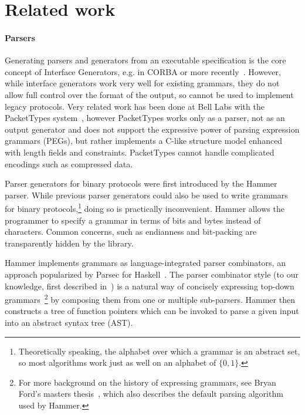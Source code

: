\section{Related work}
\label{s:relwk}






\paragraph{Parsers}

Generating parsers and generators from an executable specification
is the core concept of Interface Generators, e.g. in CORBA or more
recently~\cite{varda2008}. However, while interface generators work
very well for existing grammars, they do not allow full control over the
format of the output, so cannot be used to implement legacy protocols.
Very related work has been done at Bell Labs with the PacketTypes
system~\cite{mccann2000packet}, however PacketTypes works only as a
parser, not as an output generator and does not support the expressive
power of parsing expression grammars (PEGs), but rather implements a
C-like structure model enhanced with  length fields and
constraints. PacketTypes cannot handle complicated encodings such as  compressed data.

Parser generators for binary protocols were first introduced by the
Hammer~\cite{hammer-parser} parser.
While previous parser generators could also be used to write grammars
for binary protocols,\footnote{Theoretically speaking, the alphabet
over which a grammar is an  abstract set, so most algorithms work
just as well on an alphabet of $\{0,1\}$.} doing so is practically
inconvenient. Hammer allows the programmer to specify a grammar in
terms of bits and bytes instead of characters. Common concerns, such as
endianness and bit-packing are transparently hidden by the library. 

Hammer implements grammars as language-integrated parser combinators, an approach popularized by
Parsec for Haskell~\cite{LeijenMeijer:parsec}. The parser combinator style (to our knowledge, first
described in~\cite{burge1975recursive}) is a natural way of concisely expressing top-down
grammars~\cite{Danielsson:2010:TPC:1863543.1863585}\footnote{For more background on the history of
  expressing grammars, see Bryan Ford's masters thesis~\cite{ford2002packrat}, which also describes
  the default parsing algorithm used by Hammer.} by composing them from one or multiple sub-parsers.
Hammer then constructs a tree of function pointers which can be invoked to parse a given input into
an abstract syntax tree (AST).

